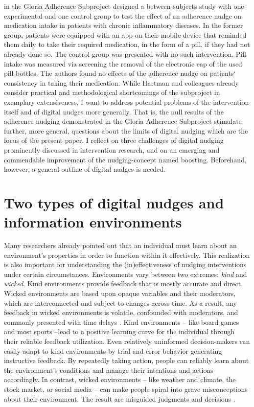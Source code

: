 \documentclass[reflection, authordate]{jote-new-article}
\begin{document}
\textcite{Hartman2021} in the Gloria Adherence Subproject designed a between-subjects study with one experimental and one control group to test the effect of an adherence nudge on medication intake in patients with chronic inflammatory diseases. In the former group, patients were equipped with an app on their mobile device that reminded them daily to take their required medication, in the form of a pill, if they had not already done so. The control group was presented with no such intervention. Pill intake was measured via screening the removal of the electronic cap of the used pill bottles. The authors found no effects of the adherence nudge on patients‘ consistency in taking their medication. While Hartman and colleagues already consider practical and methodological shortcomings of the subproject in exemplary extensiveness, I want to address potential problems of the intervention itself and of digital nudges more generally. That is, the null results of the adherence nudging demonstrated in the Gloria Adherence Subproject stimulate further, more general, questions about the limits of digital nudging which are the focus of the present paper. I reflect on three challenges of digital nudging prominently discussed in intervention research, and on an emerging and commendable improvement of the nudging-concept named boosting. Beforehand, however, a general outline of digital nudges is needed.



\section{Two types of digital nudges and information environments}



Many researchers \parencites{Bail2021}{Thomas1983}{Gigerenzer2011}{Gigerenzer2002}{Simon1956} already pointed out that an individual must learn about an environment’s properties in order to function within it effectively. This realization is also important for understanding the (in)effectiveness of nudging interventions under certain circumstances. Environments vary between two extremes: \emph{kind }and \emph{wicked}. Kind environments provide feedback that is mostly accurate and direct. Wicked environments are based upon opaque variables and their moderators, which are interconnected and subject to changes across time. As a result, any feedback in wicked environments is volatile, confounded with moderators, and commonly presented with time delays \parencite{Hogarth2001}. Kind environments – like board games and most sports –lead to a positive learning curve for the individual through their reliable feedback utilization. Even relatively uninformed decision-makers can easily adapt to kind environments by trial and error behavior generating instructive feedback. By repeatedly taking action, people can reliably learn about the environment’s conditions and manage their intentions and actions accordingly. In contrast, wicked environments – like weather and climate, the stock market, or social media – can make people spiral into grave misconceptions about their environment. The result are misguided judgments and decisions \parencites[e.g.][]{Denrell2001}{Einhorn1978}{Feiler2012}{Koehler2009}.
\end{document}
